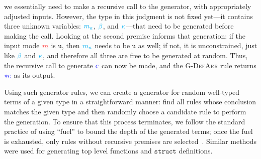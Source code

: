 \documentclass[conference]{IEEEtran}
\newcommand{\kw}[1]{\ensuremath{\mathtt{#1}}}
\newcommand{\umode}{\texttt{u}}
\newcommand{\bvar}{\ensuremath{\beta}}
\providecommand{\DIFadd}[1]{{\protect\color{blue}\uwave{#1}}} %
\providecommand{\DIFdel}[1]{{\protect\color{red}\sout{#1}}}                      %
\providecommand{\DIFaddbegin}{} %
\providecommand{\DIFaddend}{} %
\providecommand{\DIFdelbegin}{} %
\providecommand{\DIFdelend}{} %
\newcommand{\DIFscaledelfig}{0.5}
\newlength{\DIFdelgraphicswidth} %
\newlength{\DIFdelgraphicsheight} %
\newcommand{\DIFaddincludegraphics}[2][]{{\color{blue}\fbox{\DIFOincludegraphics[#1]{#2}}}} %
\newcommand{\DIFdelincludegraphics}[2][]{%
\sbox{\DIFdelgraphicsbox}{\DIFOincludegraphics[#1]{#2}}%
\settoboxwidth{\DIFdelgraphicswidth}{\DIFdelgraphicsbox} %
\settoboxtotalheight{\DIFdelgraphicsheight}{\DIFdelgraphicsbox} %
\scalebox{\DIFscaledelfig}{%
\parbox[b]{\DIFdelgraphicswidth}{\usebox{\DIFdelgraphicsbox}\\[-\baselineskip] \rule{\DIFdelgraphicswidth}{0em}}\llap{\resizebox{\DIFdelgraphicswidth}{\DIFdelgraphicsheight}{%
\setlength{\unitlength}{\DIFdelgraphicswidth}%
\begin{picture}(1,1)%
\thicklines\linethickness{2pt} %
{\color[rgb]{1,0,0}\put(0,0){\framebox(1,1){}}}%
{\color[rgb]{1,0,0}\put(0,0){\line( 1,1){1}}}%
{\color[rgb]{1,0,0}\put(0,1){\line(1,-1){1}}}%
\end{picture}%
}\hspace*{3pt}}} %
} %
\DeclareRobustCommand{\DIFaddbegin}{\DIFOaddbegin \let\includegraphics\DIFaddincludegraphics} %
\DeclareRobustCommand{\DIFaddend}{\DIFOaddend \let\includegraphics\DIFOincludegraphics} %
\DeclareRobustCommand{\DIFdelbegin}{\DIFOdelbegin \let\includegraphics\DIFdelincludegraphics} %
\DeclareRobustCommand{\DIFdelend}{\DIFOaddend \let\includegraphics\DIFOincludegraphics} %
\begin{document}
we essentially need to make a recursive call to the generator, with
appropriately adjusted inputs.
However, the type in this judgment is not fixed yet---it contains
three unknown variables: \DIFdelbegin \DIFdel{$\textcolor{cyan}{m_a}$}\DIFdelend \DIFaddbegin \DIFadd{$\textcolor{cyan}{m'}$}\DIFaddend ,
$\textcolor{cyan}{\bvar}$, and $\textcolor{cyan}{\kappa}$---that need
to be generated before making the call.
Looking at the second premise informs that generation:
if the input mode $\textcolor{red}{m}$ is $\umode$, then \DIFdelbegin \DIFdel{$\textcolor{cyan}{m_a}$
}\DIFdelend \DIFaddbegin \DIFadd{$\textcolor{cyan}{m'}$
}\DIFaddend needs to be $\umode$ as well; if not, it is unconstrained,
just like $\textcolor{cyan}{\bvar}$ and $\textcolor{cyan}{\kappa}$, and therefore all three are free to be generated at random.
Thus, the recursive call to generate $\textcolor{blue}{e}$ can now
be made, and the \textsc{G-DefArr} rule returns $\textcolor{blue}{*e}$
as its output.



Using such generator rules, we can create a generator for random
well-typed terms of a given type in a straightforward manner: find all
rules whose conclusion matches the given type and then randomly choose
a candidate rule to perform the generation. To ensure that this
process terminates, we follow the standard practice of using ``fuel'' to
bound the depth of the generated terms; once the fuel is exhausted,
only rules without recursive premises are
selected~\cite{Pierce:SF4}. Similar methods were used for
generating top level functions and \kw{struct} definitions. 
\end{document}
